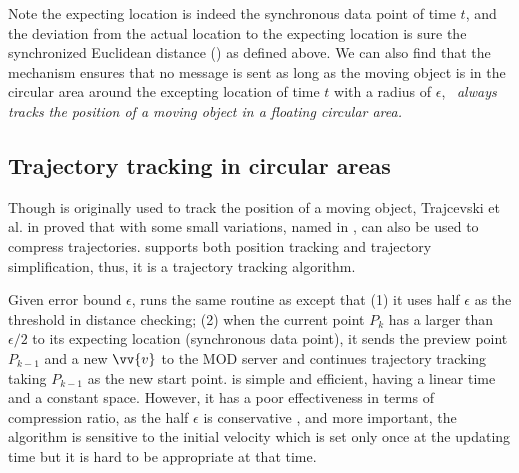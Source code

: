 Note the expecting location is indeed the synchronous data point \wrt of time $t$, and the deviation from the actual location to the expecting location is sure the synchronized Euclidean distance (\sed) as defined above. We can also find that the \ldr mechanism ensures that no message is sent as long as the moving object is in the circular area around the excepting location of time $t$ with a radius of $\epsilon$, \ie~\emph{\ldr always tracks the position of a moving object in a floating circular area.}


\subsection{Trajectory tracking in circular areas}
Though \ldr is originally used to track the position of a moving object, Trajcevski et al. in \cite{Trajcevski:LDRH} proved that \ldr with some small variations, named \ldrh in \cite{Lange:Tracking}, can also be used to compress trajectories. 
\ldrh supports both position tracking and trajectory simplification, thus, it is a trajectory tracking algorithm.

Given error bound $\epsilon$, \ldrh runs the same routine as \ldr except that (1) it uses half $\epsilon$ as the threshold in distance checking; (2) when the current point $P_k$ has a \sed larger than $\epsilon/2$ to its expecting location (synchronous data point), it sends the preview point $P_{k-1}$ and a new $\vv{v}$ to the MOD server and continues trajectory tracking taking $P_{k-1}$ as the new start point. \ldrh is simple and efficient, having a linear time and a constant space. However, it has a poor effectiveness in terms of compression ratio, as the half $\epsilon$ is conservative \cite{Lange:Tracking}, and more important, the algorithm is sensitive to the initial velocity which is set only once at the updating time but it is hard to be appropriate at that time.
 



